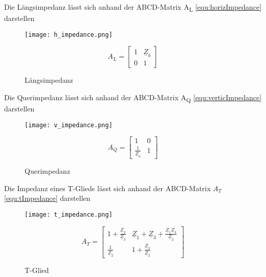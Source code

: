 Die Längsimpedanz lässt sich anhand der ABCD-Matrix A\textsubscript{L} \ref{equ:horizImpedance} darstellen
\begin{figure}[H]
	\begin{minipage}[h]{0.45\linewidth}
		\centering
		\texttt{[image: h\_impedance.png]}
		\caption{Längsimpedanz}
	\end{minipage}
	\begin{minipage}[h]{0.45\linewidth}
		\centering
		\begin{equation}\label{equ:horizImpedance}
			A_L = \left[\begin{matrix}
			1&\underline{Z}_b\\0&1
			\end{matrix}\right]
		\end{equation}
	\end{minipage}
\end{figure}
Die Querimpedanz lässt sich anhand der ABCD-Matrix A\textsubscript{Q} \ref{equ:verticImpedance} darstellen
\begin{figure}[H]
	\begin{minipage}[h]{0.45\linewidth}
		\centering
		\texttt{[image: v\_impedance.png]}
		\caption{Querimpedanz}
	\end{minipage}
	\begin{minipage}[h]{0.45\linewidth}
		\centering
		\begin{equation}\label{equ:verticImpedance}
			A_Q = \left[\begin{matrix}
			1&0\\\frac{1}{\underline{Z}_a}&1
			\end{matrix}\right]
		\end{equation}
	\end{minipage}
\end{figure}
Die Impedanz eines T-Glieds lässt sich anhand der ABCD-Matrix $A_T$ \ref{equ:tImpedance} darstellen
\begin{figure}[H]
	\begin{minipage}[h]{0.45\linewidth}
		\centering
		\texttt{[image: t\_impedance.png]}\label{fig:tImpedance}
		\caption{T-Glied}
	\end{minipage}
	\begin{minipage}[h]{0.45\linewidth}
		\centering
		\begin{equation}\label{equ:tImpedance}
			A_T = \left[\begin{matrix}
			1+\frac{\underline{Z}_2}{\underline{Z}_3}&\underline{Z}_1+\underline{Z}_3+\frac{\underline{Z}_1\underline{Z}_3}{\underline{Z}_2}\\
			\frac{1}{\underline{Z}_2}&1+\frac{\underline{Z}_3}{\underline{Z}_2}
			\end{matrix}\right]
		\end{equation}
	\end{minipage}
\end{figure}
